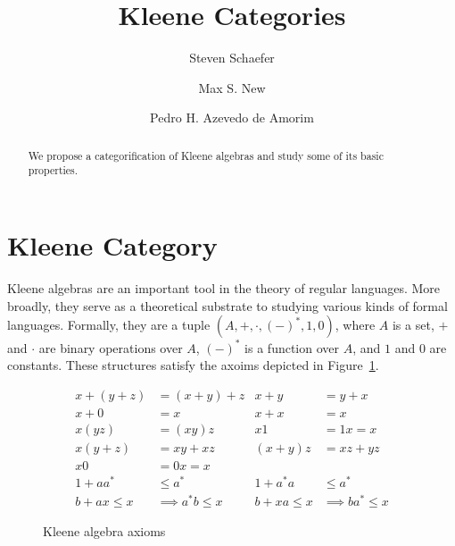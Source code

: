 \documentclass[acmsmall,anonymous,review,screen]{acmart}
\begin{document}
\title{Kleene Categories}
\author{Steven Schaefer}

\author{Max S. New}

\author{Pedro H. Azevedo de Amorim}

\begin{abstract}
  We propose a categorification of Kleene algebras and study some of its basic properties.
\end{abstract}

\maketitle


\section{Kleene Category}

Kleene algebras are an important tool in the theory of regular
languages. More broadly, they serve as a theoretical substrate to
studying various kinds of formal languages. Formally, they are a tuple
$(A, +, \cdot, (-)^*, 1, 0)$, where $A$ is a set, $+$ and $\cdot$
are binary operations over $A$, $(-)^*$ is a function over $A$, and
$1$ and $0$ are constants. These structures satisfy the axoims depicted
in Figure~\ref{fig:axioms}.

\begin{figure}
  \begin{align*}
    x + (y + z) &= (x + y) + z & x + y &= y + x\\
    x + 0 &= x & x + x &= x\\
    x(yz) &= (xy)z & x1 &= 1x = x\\
    x(y + z) &= xy + xz & (x + y)z &= xz + yz\\
    x0 &= 0x = x & & \\
    1 + aa^* &\leq a^* & 1 + a^*a &\leq a^*\\
     b + ax \leq x &\implies a^*b \leq x &  b + xa \leq x &\implies ba^* \leq x
  \end{align*}
  \label{fig:axioms}
  \caption{Kleene algebra axioms}
\end{figure}
\end{document}
